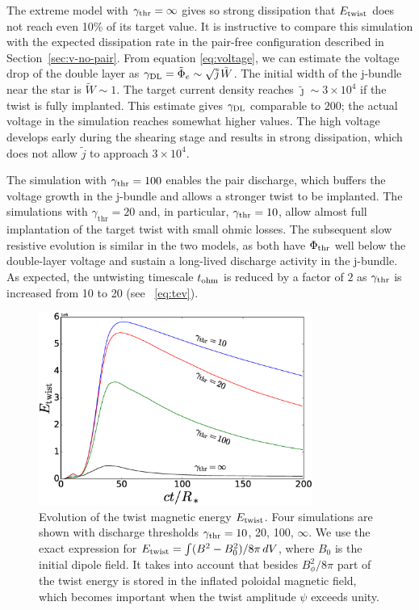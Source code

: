 The extreme model with $\gamma_{\rm thr}=\infty$ gives so strong dissipation that $E_{\rm twist}$
does not reach even 10\% of its target value. It is instructive to compare this
simulation with the expected dissipation rate in the pair-free configuration
described in Section~\ref{sec:v-no-pair}. From equation \eqref{eq:voltage}, we
can estimate the voltage drop of the double layer as $\gamma_{\rm DL}=\tilde{\Phi}_{e} \sim
\sqrt{\tilde{\jmath}}\,\tilde{W}$. The initial width of the j-bundle near the
star is $\tilde{W}\sim 1$. The target current density reaches $\tilde{\jmath}
\sim 3\times 10^4$ if the twist is fully implanted. This estimate gives $\gamma_{\rm DL}$
comparable to $200$; the actual voltage in the simulation reaches somewhat
higher values. The high voltage develops early during the shearing stage and
results in strong dissipation, which does not allow $\tilde{j}$ to approach
$3\times 10^4$.

The simulation with $\gamma_{\rm thr}=100$ enables the pair discharge, which buffers the
voltage growth in the j-bundle and allows a stronger twist to be implanted.
The simulations with $\gamma_\mathrm{thr}=20$ and, in particular, $\gamma_{\rm thr}=10$,
allow almost full implantation of the target twist with small ohmic losses. The subsequent  slow resistive evolution is similar in the two models, as both have $\Phi_{\rm thr}$ well below
the double-layer voltage and sustain a long-lived discharge activity in the j-bundle.
As expected, the untwisting timescale $t_{\rm ohm}$ is reduced by a factor of $2$ as
$\gamma_{\rm thr}$ is increased from 10 to 20 (see \Eq~\ref{eq:tev}).


\begin{figure}[t]
  \centering
  \includegraphics[width=0.8\textwidth]{pics/chap4/B-energy.eps}
  \caption[Evolution of energy in the magnetar magnetosphere]{Evolution of the
    twist magnetic energy $E_{\rm twist}$. Four simulations are shown with discharge
    thresholds $\gamma_{\rm thr}=10$, 20, 100, $\infty$. We use the exact expression for
    $E_{\rm twist} = \int (B^2 - B_0^2)/8\pi\, dV$, where $B_0$ is the initial dipole
    field. It takes into account that besides $B_\phi^2/8\pi$ part of the twist
    energy is stored in the inflated poloidal magnetic field, which becomes
    important when the twist amplitude $\psi$ exceeds unity. }
  \label{fig:b-energy}
\end{figure}

